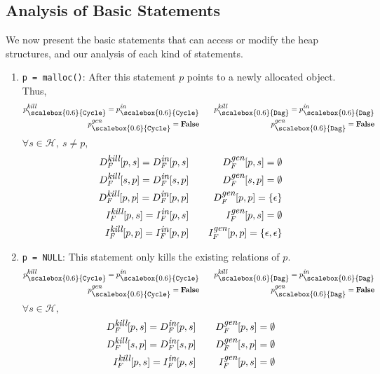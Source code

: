 \documentclass[letterpaper]{sig-alternate}
\newcommand{\is}{\itemsep -1mm} %
\newcommand{\p}{\ensuremath{p}}
\newcommand{\s}{\ensuremath{s}}
\newcommand{\heap}{\ensuremath{\mathcal{H}}}
\newcommand{\subC}{\mbox{\scalebox{0.6}{\Cycle}}}
\newcommand{\subD}{\mbox{\scalebox{0.6}{\Dag}}}
\newcommand{\epsilonset}{\ensuremath{\{\epsilon\}}}
\newcommand{\epsilonpairset}{\ensuremath{\{\epsilon,\epsilon\}}}
\newcommand{\din}{\mbox{\footnotesize\em in}}
\newcommand{\dkill}{\mbox{\footnotesize\em kill}}
\newcommand{\dgen}{\mbox{\footnotesize\em gen}}
\newcommand{\GenC}[1]{\ensuremath{{#1}_{\subC}^{\dgen}}}
\newcommand{\GenD}[1]{\ensuremath{{#1}_{\subD}^{\dgen}}}
\newcommand{\KillC}[1]{\ensuremath{{#1}_{\subC}^{\dkill}}}
\newcommand{\KillD}[1]{\ensuremath{{#1}_{\subD}^{\dkill}}}
\newcommand{\InC}[1]{\ensuremath{{#1}_{\subC}^{\din}}}
\newcommand{\InD}[1]{\ensuremath{{#1}_{\subD}^{\din}}}
\newcommand{\Dag}{{\tt Dag}}
\newcommand{\Cycle}{{\tt Cycle}}
\newcommand{\false}{\textbf{False}}
\begin{document}
\subsection{Analysis of Basic Statements} \label{Analysis_of_Basic_Statements} 
We now present the basic statements that can access or modify
the heap structures, and our analysis of each kind of
statements.
\begin{enumerate}\is
\item {{\tt p = malloc()}}:
  After this statement $\p$ points to a newly allocated
  object. Thus,
\begin{eqnarray*}
  \KillC{p}  = \InC{p} &\quad& \KillD{p} = \InD{p} \\
  \GenC{p} = \false 	 &\quad& \GenD{p} = \false 
\end{eqnarray*}
$\forall \s \in \heap,\ \s \not= \p,$
\begin{eqnarray*}
  D_F^{\dkill}[\p,\s]  =  D_F^{\din}[\p,\s] &\quad&
  D_F^{\dgen}[\p,\s]    =  \emptyset \\ 
  D_F^{\dkill}[\s,\p]  =  D_F^{\din}[\s,\p] &\quad&
  D_F^{\dgen}[\s,\p]    =  \emptyset \\
  D_F^{\dkill}[\p,\p]  =  D_F^{\din}[\p,\p] &\quad&
  D_F^{\dgen}[\p,\p]    =  \epsilonset\\
  I_F^{\dkill}[\p,\s]  =  I_F^{\din}[\p,\s] &\quad&
  I_F^{\dgen}[\p,\s]    =  \emptyset \\
  I_F^{\dkill}[\p,\p]  =  I_F^{\din}[\p,\p] &\quad&
  I_F^{\dgen}[\p,\p]    =  \epsilonpairset 
\end{eqnarray*}

\item{\tt p = NULL}:
This statement only kills the existing relations of \p.
\begin{eqnarray*}
  \KillC{p}  = \InC{p} &\quad& \KillD{p} = \InD{p} \\
  \GenC{p} = \false 	 &\quad& \GenD{p} = \false \\
\end{eqnarray*}
$\forall \s \in \heap,$
\begin{eqnarray*}
  D_F^{\dkill}[\p,\s]  =  D_F^{\din}[\p,\s] &\quad&
  D_F^{\dgen}[\p,\s]    =  \emptyset \\ 
  D_F^{\dkill}[\s,\p]  =  D_F^{\din}[\s,\p] &\quad&
  D_F^{\dgen}[\s,\p]    =  \emptyset \\
  I_F^{\dkill}[\p,\s]  =  I_F^{\din}[\p,\s] &\quad&
  I_F^{\dgen}[\p,\s]    =  \emptyset 
\end{eqnarray*}


\end{enumerate}
\end{document}
